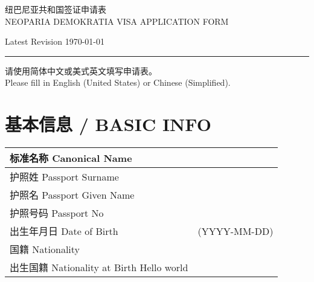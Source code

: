 \documentclass[a4paper,10pt]{article}
\begin{document}
\sffamily
\pagestyle{empty}

\begin{minipage}{\linewidth}
	\center
	\Large
	纽巴尼亚共和国签证申请表\\
	NEOPARIA DEMOKRATIA VISA APPLICATION FORM

	\vspace{4pt}
	\normalsize
	Latest Revision \today
\end{minipage}

\vspace{10pt}
\hrule
\vspace{5pt}

\begin{minipage}{\linewidth}
	请使用简体中文或美式英文填写申请表。\\
	Please fill in English (United States) or Chinese (Simplified).
\end{minipage}



\section{基本信息 / BASIC INFO}


\fontsize{9pt}{9pt}\selectfont
\begin{minipage}{\linewidth}
	\begin{tabu} {|X|X[3]|}
		\hline
		{标准名称 Canonical Name}       & {}             \\
		\hline
		{护照姓 Passport Surname}       & {}             \\
		\hline
		{护照名 Passport Given Name}    & {}             \\
		\hline
		{护照号码 Passport No}          & {}             \\
		\hline
		{出生年月日 Date of Birth}      & {(YYYY-MM-DD)} \\
		\hline
		{国籍 Nationality}              & {}             \\
		\hline
		{出生国籍 Nationality at Birth \hfill Hello world} & {}             \\
		\hline
	\end{tabu}
\end{minipage}
\end{document}
